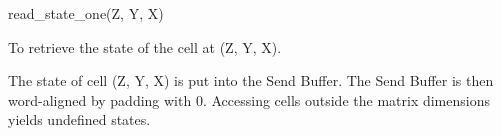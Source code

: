 

\format
read\_state\_one(Z, Y, X)

\purpose

To retrieve the state of the cell at (Z, Y, X).

\description

The state of cell (Z, Y, X) is put into the Send Buffer.
The Send Buffer is then word-aligned by padding with 0.
Accessing cells outside the matrix dimensions yields undefined states.
